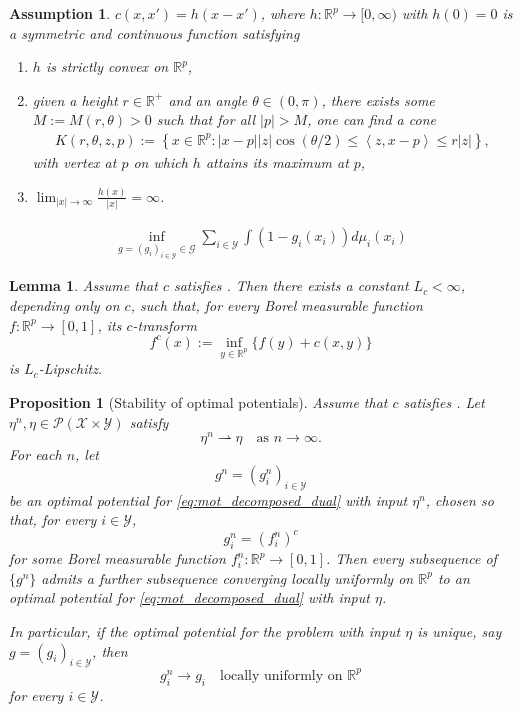 \documentclass[10pt,a4paper]{amsart}
\newtheorem{assumption}{Assumption}
\newtheorem{lemma}{Lemma}
\newtheorem{proposition}{Proposition}
\newcommand{\R}{\mathbb{R}}
\begin{document}
\begin{assumption}\label{assumption: strict convexity of cost function}
$c(x,x')=h(x-x')$, where $h:\mathbb{R}^p \rightarrow [0, \infty)$ with $h(0)=0$ is a symmetric and continuous function satisfying
\begin{enumerate}
	\item[(A1)] $h$ is strictly convex on $\mathbb{R}^p $,
	\item[(A2)] given a height $r\in \R^+$ and an angle $\theta \in (0,\pi) $, there exists some $M:=M(r, \theta)>0$ such that for all $|p |>M$, one can find a cone 
	\begin{align*}
		K(r, \theta, z,p):=\left\lbrace x\in \mathbb{R}^p  : | x-p|| z|\cos(\theta/2)\leq \left< z,x-p \right>\leq  r| z| \right\rbrace,
	\end{align*}
	with vertex at $p$ on which $h$ attains its maximum at $p$,
	\item[(A3)] $\lim_{|x | \rightarrow \infty}\frac{h(x)}{|x | }= \infty $.
\end{enumerate}    
\end{assumption}

\begin{equation}\label{eq:mot_decomposed_dual}
\begin{aligned}
    \inf_{g=(g_i)_{i \in \mathcal{Y}} \in \mathcal{G}} \sum_{i \in \mathcal{Y}} \int (1-g_i(x_i)) d\mu_i(x_i)    
\end{aligned}
\end{equation}

\begin{lemma}
\label{lem: uniform regularity of potentials}
Assume that $c$ satisfies
.
Then there exists a constant $L_c<\infty$, depending only on $c$,
such that, for every Borel measurable function
$f:\mathbb R^p\to[0,1]$, its $c$-transform
\[
    f^c(x)
    :=
    \inf_{y\in\mathbb R^p}
    \{f(y)+c(x,y)\}
\]
is $L_c$-Lipschitz.
\end{lemma}

\begin{proposition}[Stability of optimal potentials]
\label{prop: stability of optimal potentials}
Assume that $c$ satisfies
.
Let $\eta^n,\eta\in\mathcal P(\mathcal X\times\mathcal Y)$ satisfy
\[
    \eta^n\rightharpoonup\eta
    \quad\text{as }n\to\infty.
\]
For each $n$, let
\[
    g^n=(g_i^n)_{i\in\mathcal Y}
\]
be an optimal potential for \eqref{eq:mot_decomposed_dual} with input
$\eta^n$, chosen so that, for every $i\in\mathcal Y$,
\[
    g_i^n=(f_i^n)^c
\]
for some Borel measurable function
$f_i^n:\mathbb R^p\to[0,1]$. Then every subsequence of $\{g^n\}$ admits a further subsequence
converging locally uniformly on $\mathbb R^p$ to an optimal potential
for \eqref{eq:mot_decomposed_dual} with input $\eta$.

In particular, if the optimal potential for the problem with input
$\eta$ is unique, say $g=(g_i)_{i\in\mathcal Y}$, then
\[
    g_i^n\longrightarrow g_i
    \quad
    \text{locally uniformly on }\mathbb R^p
\]
for every $i\in\mathcal Y$.
\end{proposition}
\end{document}
